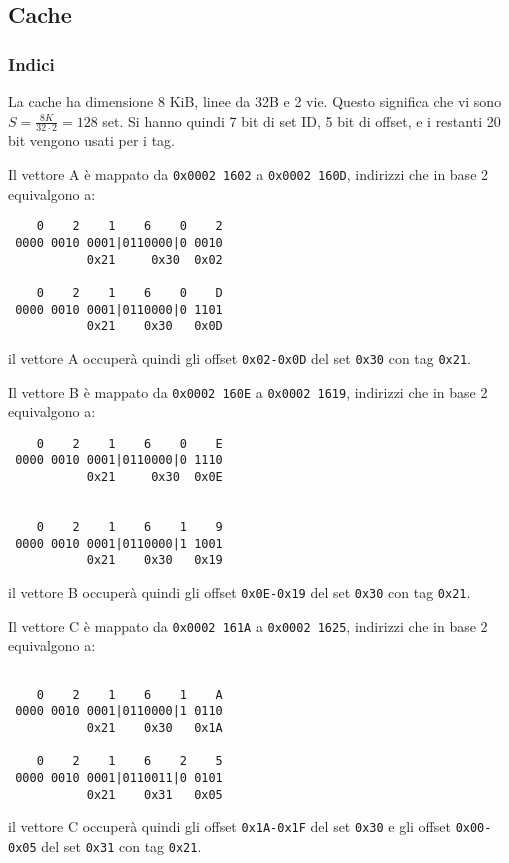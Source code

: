 \documentclass[a4paper]{article}
\begin{document}
\subsection{Cache}
\subsubsection{Indici}
La cache ha dimensione 8 KiB, linee da 32B e 2 vie. 
Questo significa che vi sono $S = \frac{8K}{32 \cdot 2} = 128$ set. 
Si hanno quindi 7 bit di set ID, 5 bit di offset, e i restanti 20 bit vengono usati per i tag.

Il vettore A è mappato da \texttt{0x0002 1602} a \texttt{0x0002 160D}, indirizzi che in base 2 equivalgono a:

\begin{verbatim}
    0    2    1    6    0    2
 0000 0010 0001|0110000|0 0010
           0x21     0x30  0x02

    0    2    1    6    0    D
 0000 0010 0001|0110000|0 1101
           0x21    0x30   0x0D
\end{verbatim}

il vettore A occuperà quindi gli offset \texttt{0x02-0x0D} del set \texttt{0x30} con tag \texttt{0x21}.

Il vettore B è mappato da \texttt{0x0002 160E} a \texttt{0x0002 1619}, indirizzi che in base 2 equivalgono a:

\begin{verbatim}
    0    2    1    6    0    E
 0000 0010 0001|0110000|0 1110
           0x21     0x30  0x0E


    0    2    1    6    1    9
 0000 0010 0001|0110000|1 1001
           0x21    0x30   0x19
\end{verbatim}

il vettore B occuperà quindi gli offset \texttt{0x0E-0x19} del set \texttt{0x30} con tag \texttt{0x21}.

Il vettore C è mappato da \texttt{0x0002 161A} a \texttt{0x0002 1625}, indirizzi che in base 2 equivalgono a:

\begin{verbatim}

    0    2    1    6    1    A
 0000 0010 0001|0110000|1 0110
           0x21    0x30   0x1A    

    0    2    1    6    2    5
 0000 0010 0001|0110011|0 0101
           0x21    0x31   0x05
\end{verbatim}

il vettore C occuperà quindi gli offset \texttt{0x1A-0x1F} del set \texttt{0x30} e gli offset \texttt{0x00-0x05} del set \texttt{0x31} con tag \texttt{0x21}.
\end{document}
